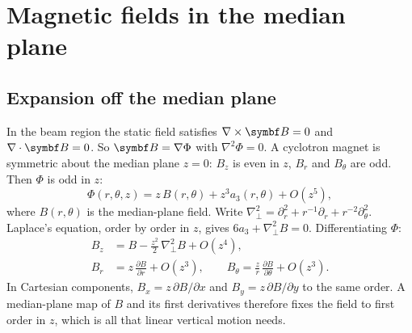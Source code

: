 \chapter{Magnetic fields in the median plane}\label{ch:fields}

\section{Expansion off the median plane}
In the beam region the static field satisfies $\nabla\times\vect B = 0$ and $\nabla\cdot\vect B = 0$.
So $\vect B = \nabla\Phi$ with $\nabla^2\Phi = 0$.
A cyclotron magnet is symmetric about the median plane $z=0$: $B_z$ is even in $z$, $B_r$ and $B_\theta$ are odd.
Then $\Phi$ is odd in $z$:
\begin{equation}
\Phi(r,\theta,z) = z\,B(r,\theta) + z^3 a_3(r,\theta) + O(z^5),
\end{equation}
where $B(r,\theta)$ is the median-plane field.
Write $\nabla_\perp^2 = \partial_r^2 + r^{-1}\partial_r + r^{-2}\partial_\theta^2$.
Laplace's equation, order by order in $z$, gives $6a_3 + \nabla_\perp^2 B = 0$.
Differentiating $\Phi$:
\begin{align}
B_z &= B - \frac{z^2}{2}\,\nabla_\perp^2 B + O(z^4),\label{eq:bz-expansion}\\
B_r &= z\,\frac{\partial B}{\partial r} + O(z^3),\qquad
B_\theta = \frac{z}{r}\,\frac{\partial B}{\partial\theta} + O(z^3).\label{eq:br-expansion}
\end{align}
In Cartesian components, $B_x = z\,\partial B/\partial x$ and $B_y = z\,\partial B/\partial y$ to the same order.
A median-plane map of $B$ and its first derivatives therefore fixes the field to first order in $z$, which is all that
linear vertical motion needs.

